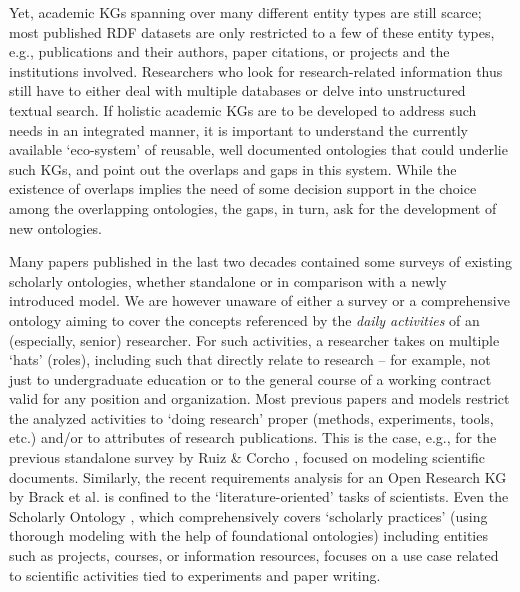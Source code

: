 %
Yet, academic KGs spanning over many different entity types are still scarce; most published RDF datasets are only restricted to a few of these entity types, e.g., publications and their authors, paper citations, or projects and the institutions involved. Researchers who look for research-related information thus still have to either deal with multiple %
databases or delve into unstructured textual search. If holistic academic KGs are to be developed to address such needs in an integrated manner, it is important to understand the currently available `eco-system' of reusable, well documented ontologies that could underlie such KGs, and point out the overlaps and %
gaps in this system. While the existence of overlaps implies the need of some decision support in the choice among the overlapping ontologies, the gaps, in turn, ask for the development of new ontologies. 

Many papers published in the last two decades contained some surveys of existing scholarly ontologies, whether standalone or in comparison with a newly introduced model.
We are however unaware of either a survey or a comprehensive ontology aiming to cover the concepts referenced by the \emph{daily activities} of an (especially, senior) researcher. For such activities, a researcher takes on multiple `hats' (roles), including such that directly relate to research -- for example, not just to undergraduate education or to the general course of a working contract valid for any position and organization.
Most previous papers and models restrict the analyzed activities to `doing research' proper (methods, experiments, tools, etc.) and/or to attributes of research publications.
This is the case, e.g., for the previous standalone survey by Ruiz \& Corcho \cite{Ruiz}, focused on modeling scientific documents. 
Similarly, the recent requirements analysis for an Open Research KG by Brack et al. \cite{Brack} is confined to the `literature-oriented' tasks of scientists.
Even the Scholarly Ontology \cite{DBLP:journals/jodl/PertsasC17}, which  comprehensively covers `scholarly practices' (using thorough modeling with the help of foundational ontologies) including entities such as projects, courses, or information resources, focuses on a use case related to scientific activities tied to experiments and paper writing.


